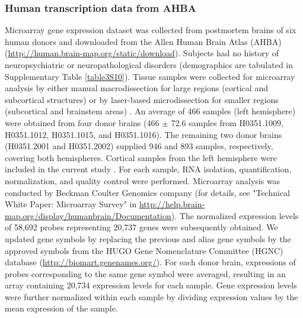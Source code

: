 \begin{refsection}
\subsubsection*{Human transcription data from AHBA}
Microarray gene expression dataset was collected from postmortem brains of six human donors and downloaded from the Allen Human Brain Atlas (AHBA) (\url{http://human.brain-map.org/static/download}). Subjects had no history of neuropsychiatric or neuropathological disorders (demographics are tabulated in Supplementary Table \ref{table3S10}). Tissue samples were collected for microarray analysis by either manual macrodissection for large regions (cortical and subcortical structures) or by laser-based microdissection for smaller regions (subcortical and brainstem areas) \citep{Hawrylycz2012AnAC}. An average of 466 samples (left hemisphere) were obtained from four donor brains (466 $ \pm $  72.6 samples from H0351.1009, H0351.1012, H0351.1015, and H0351.1016). The remaining two donor brains (H0351.2001 and H0351.2002) supplied 946 and 893 samples, respectively, covering both hemispheres. Cortical samples from the left hemisphere were included in the current study \citep{Romme2017ConnectomeDA}. For each sample, RNA isolation, quantification, normalization, and quality control were performed. Microarray analysis was conducted by Beckman Coulter Genomics company (for details, see "Technical White Paper: Microarray Survey" in \url{http://help.brain-map.org/display/humanbrain/Documentation}). The normalized expression levels of 58,692 probes representing 20,737 genes were subsequently obtained. We updated gene symbols by replacing the previous and alias gene symbols by the approved symbols from the HUGO Gene Nomenclature Committee (HGNC) database (\url{http://biomart.genenames.org/}). For each donor brain, expressions of probes corresponding to the same gene symbol were averaged, resulting in an array containing 20,734 expression levels for each sample. Gene expression levels were further normalized within each sample by dividing expression values by the mean expression of the sample.


\end{refsection}
